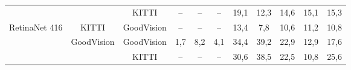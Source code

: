 \documentclass[twoside]{ctuthesis}
\theoremstyle{plain}
\theoremstyle{definition}
\theoremstyle{note}
\begin{document}
\begin{table}
{\begin{tabular}{|c|c|c|c|c|c|c|c|c|c|c|}
                                                         &                                                                     & KITTI                                                              & --                                                                     & --                                                                 & --                                                                        & 19,1                                                               & 12,3                                                                  & 14,6                                                                 & 15,1                                                               & 15,3                                                            \\ \cline{3-11} 
\multirow{-3}{*}{RetinaNet 416}                          & \multirow{-2}{*}{KITTI}                                             & GoodVision                                                         & --                                                                     & --                                                                 & --                                                                        & 13,4                                                               & 7,8                                                                   & 10,6                                                                 & 11,2                                                               & 10,8                                                            \\ \hline
                                                         & GoodVision                                                          & GoodVision                                                         & 1,7                                                                    & 8,2                                                                & 4,1                                                                       & 34,4                                                               & 39,2                                                                  & 22,9                                                                 & 12,9                                                               & 17,6                                                            \\ \cline{2-11} 
                                                         &                                                                     & KITTI                                                              & --                                                                     & --                                                                 & --                                                                        & 30,6                                                               & 38,5                                                                  & 22,5                                                                 & 10,8                                                               & 25,6                                                            \\ \cline{3-11} 

\end{tabular}}
\end{table}
\end{document}
